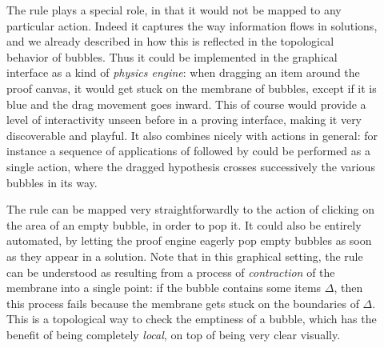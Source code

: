 \begin{description}
  \item[\textbf{\flow}]
    The {} rule plays a special role, in that it would not be mapped
    to any particular action. Indeed it captures the way information flows in
    solutions, and we already described in  how this is
    reflected in the topological behavior of bubbles. Thus it could be
    implemented in the graphical interface as a kind of \emph{physics engine}:
    when dragging an item around the proof canvas, it would get stuck on the
    membrane of bubbles, except if it is blue and the drag movement goes inward.
    This of course would provide a level of interactivity unseen before in a
    proving interface, making it very discoverable and playful. It also combines
    nicely with  actions in general: for instance a sequence of applications
    of {} followed by {} could be performed as
    a single  action, where the dragged hypothesis crosses successively the
    various bubbles in its way.
  \item[\textbf{\membrane}]
    The {} rule can be mapped very straightforwardly to the action of
    clicking on the area of an empty bubble, in order to pop it. It could also
    be entirely automated, by letting the proof engine eagerly pop empty bubbles
    as soon as they appear in a solution. Note that in this graphical setting,
    the {} rule can be understood as resulting from a process of
    \emph{contraction} of the membrane into a single point: if the bubble contains some
    items $\Delta$, then this process fails because the membrane gets stuck on
    the boundaries of $\Delta$. This is a topological way to check the emptiness
    of a bubble, which has the benefit of being completely \emph{local}, on top
    of being very clear visually.
  \item[\textbf{\resource}]

\end{description}
